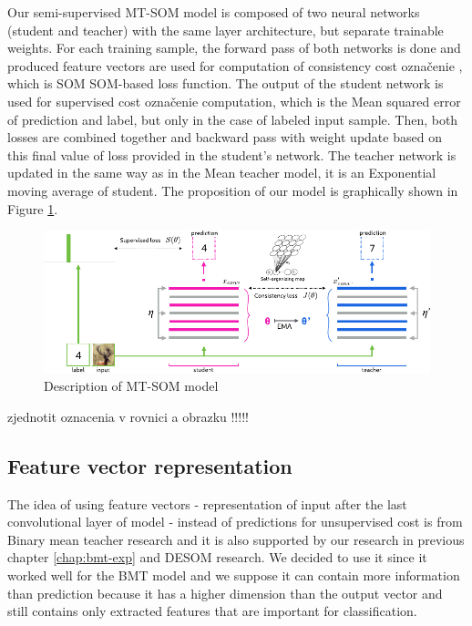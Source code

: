 Our semi-supervised MT-SOM model is composed of two neural networks (student and teacher) with the same layer architecture, but separate trainable weights. For each training sample, the forward pass of both networks is done and produced feature vectors are used for computation of consistency cost \color{red} označenie \color{black}, which is SOM SOM-based loss function. The output of the student network is used for supervised cost \color{red} označenie \color{black} computation, which is the Mean squared error of prediction and label, but only in the case of labeled input sample. Then, both losses are combined together and backward pass with weight update based on this final value of loss provided in the student's network. The teacher network is updated in the same way as in the Mean teacher model, it is an Exponential moving average of student. The proposition of our model is graphically shown in Figure \ref{fig:our-model}. 

\begin{figure}[h!]
    \centering
    \includegraphics[width = 1\textwidth]{figs/mean_teacher_som-1.pdf}
    \caption{Description of MT-SOM model}
    \label{fig:our-model}
\end{figure}


\color{red} zjednotit oznacenia v rovnici a obrazku !!!!! \color{black}


\subsection{Feature vector representation}
The idea of using feature vectors - representation of input after the last convolutional layer of model - instead of predictions for unsupervised cost is from Binary mean teacher research \cite{tuna-bmt} and it is also supported by our research in previous chapter \ref{chap:bmt-exp} and DESOM research. We decided to use it since it worked well for the BMT model and we suppose it can contain more information than prediction because it has a higher dimension than the output vector and still contains only extracted features that are important for classification.

